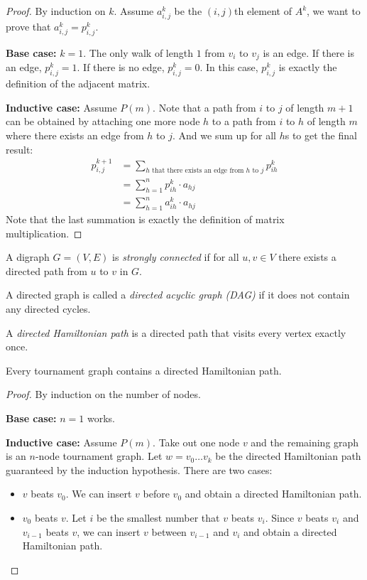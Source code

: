 \documentclass[11pt]{article}
\begin{document}
\begin{proof}
By induction on $k$. Assume $a_{i,j}^k$ be the $(i,j)$th element of $A^k$, we want to prove that
$a_{i,j}^k=p_{i,j}^k$.

\textbf{Base case:} $k=1$. The only walk of length $1$ from $v_i$ to $v_j$ is an edge. If there is
an edge, $p_{i,j}^k=1$. If there is no edge, $p_{i,j}^k=0$. In this case, $p_{i,j}^k$ is exactly
the definition of the adjacent matrix.

\textbf{Inductive case:} Assume $P(m)$. Note that a path from $i$ to $j$ of length $m+1$ can be
obtained by attaching one more node $h$ to a path from $i$ to $h$ of length $m$ where there exists
an edge from $h$ to $j$. And we sum up for all $h$s to get the final result:
\begin{align*}
p_{i,j}^{k+1} &= \sum_{h\text{ that there exists an edge from }h\text{ to }j} p_{ih}^k \\
&= \sum_{h=1}^n p_{ih}^k \cdot a_{hj} \\
&= \sum_{h=1}^n a_{ih}^k \cdot a_{hj}
\end{align*}
Note that the last summation is exactly the definition of matrix multiplication.

\end{proof}

\begin{definition}
A digraph $G=(V,E)$ is \emph{strongly connected} if for all $u,v \in V$ there exists a directed
path from $u$ to $v$ in $G$.
\end{definition}

\begin{definition}
A directed graph is called a \emph{directed acyclic graph (DAG)} if it does not contain any
directed cycles.
\end{definition}

\begin{definition}
A \emph{directed Hamiltonian path} is a directed path that visits every vertex exactly once.
\end{definition}

\begin{theorem}
Every tournament graph contains a directed Hamiltonian path.
\end{theorem}

\begin{proof}
By induction on the number of nodes.

\textbf{Base case:} $n=1$ works.

\textbf{Inductive case:} Assume $P(m)$. Take out one node $v$ and the remaining graph is an
$n$-node tournament graph. Let $w=v_0 \dots v_k$ be the directed Hamiltonian path guaranteed by the
induction hypothesis. There are two cases:
\begin{itemize}
\item $v$ beats $v_0$. We can insert $v$ before $v_0$ and obtain a directed Hamiltonian path.
\item $v_0$ beats $v$. Let $i$ be the smallest number that $v$ beats $v_i$. Since $v$ beats $v_i$
and $v_{i-1}$ beats $v$, we can insert $v$ between $v_{i-1}$ and $v_i$ and obtain a directed
Hamiltonian path.
\end{itemize}
\end{proof}
\end{document}
